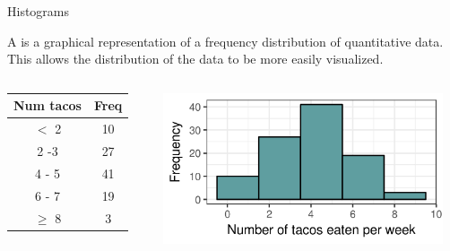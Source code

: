 \documentclass[xcolor=table, aspectratio=169, bigger]{beamer}
\begin{document}
\begin{frame}{Histograms}
\begin{block}{}
A  is a graphical representation of a frequency distribution of quantitative data. This allows the distribution of the data to be more easily visualized.
\end{block}

\pause
\begin{columns}
\begin{column}{0.35\textwidth}
\begin{exampleblock}{}
\begin{center}
\begin{tabular}{cc}
Num tacos & Freq \\
\hline
 $<$ 2 & 10 \\
2 -3 & 27 \\
4 - 5 & 41 \\
6 - 7 & 19 \\
 $\ge$ 8& 3 \\
\end{tabular}
\end{center}
\end{exampleblock}
\end{column}

\begin{column}{0.65\textwidth}
\begin{center}
\includegraphics[width=3.25in]{../images/wk04_taco_hist}

\end{center}
\end{column}
\end{columns}

\end{frame}
\end{document}
